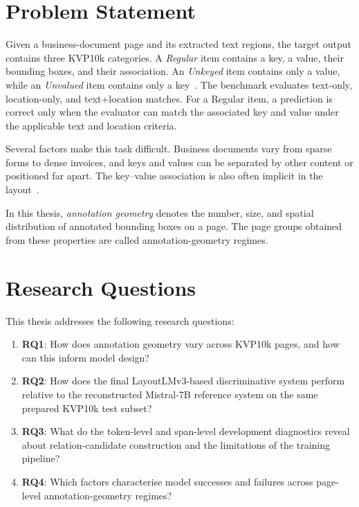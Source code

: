 \section{Problem Statement}
\label{sec:problem}

Given a business-document page and its extracted text regions, the target
output contains three KVP10k categories. A \emph{Regular} item contains a key,
a value, their bounding boxes, and their association. An \emph{Unkeyed} item
contains only a value, while an \emph{Unvalued} item contains only a
key~\cite{kvp10k}. The benchmark evaluates text-only, location-only, and
text+location matches. For a Regular item, a prediction is correct only when
the evaluator can match the associated key and value under the applicable text
and location criteria.

Several factors make this task difficult. Business documents vary from sparse
forms to dense invoices, and keys and values can be separated by other content
or positioned far apart. The key--value association is also often implicit in
the layout~\cite{layoutlm,kvp10k,spade,bros}.

In this thesis, \emph{annotation geometry} denotes the number, size, and spatial
distribution of annotated bounding boxes on a page. The page groups obtained
from these properties are called annotation-geometry regimes.

\section{Research Questions}
\label{sec:research_questions}

This thesis addresses the following research questions:

\begin{enumerate}
    \item \textbf{RQ1}: How does annotation geometry vary across KVP10k pages, and how can this inform model design?
    
    \item \textbf{RQ2}: How does the final LayoutLMv3-based discriminative
    system perform relative to the reconstructed Mistral-7B reference system
    on the same prepared KVP10k test subset?
    
    \item \textbf{RQ3}: What do the token-level and span-level development
    diagnostics reveal about relation-candidate construction and the
    limitations of the training pipeline?
    
    \item \textbf{RQ4}: Which factors characterise model successes and failures across page-level annotation-geometry regimes?
\end{enumerate}

